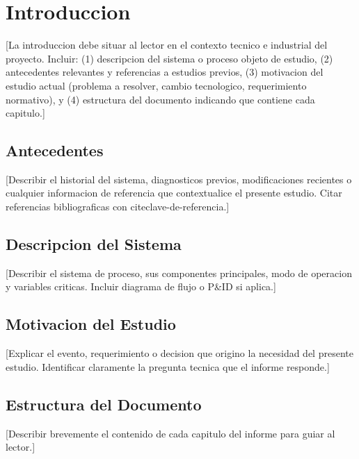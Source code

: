 \section{Introduccion}
\label{sec:intro}

[La introduccion debe situar al lector en el contexto tecnico e industrial del proyecto.
Incluir: (1) descripcion del sistema o proceso objeto de estudio, (2) antecedentes
relevantes y referencias a estudios previos, (3) motivacion del estudio actual
(problema a resolver, cambio tecnologico, requerimiento normativo), y (4) estructura
del documento indicando que contiene cada capitulo.]

\subsection{Antecedentes}

[Describir el historial del sistema, diagnosticos previos, modificaciones recientes
o cualquier informacion de referencia que contextualice el presente estudio.
Citar referencias bibliograficas con cite{clave-de-referencia}.]

\subsection{Descripcion del Sistema}

[Describir el sistema de proceso, sus componentes principales, modo de operacion
y variables criticas. Incluir diagrama de flujo o P\&ID si aplica.]

\subsection{Motivacion del Estudio}

[Explicar el evento, requerimiento o decision que origino la necesidad del presente
estudio. Identificar claramente la pregunta tecnica que el informe responde.]

\subsection{Estructura del Documento}

[Describir brevemente el contenido de cada capitulo del informe para guiar al lector.]
